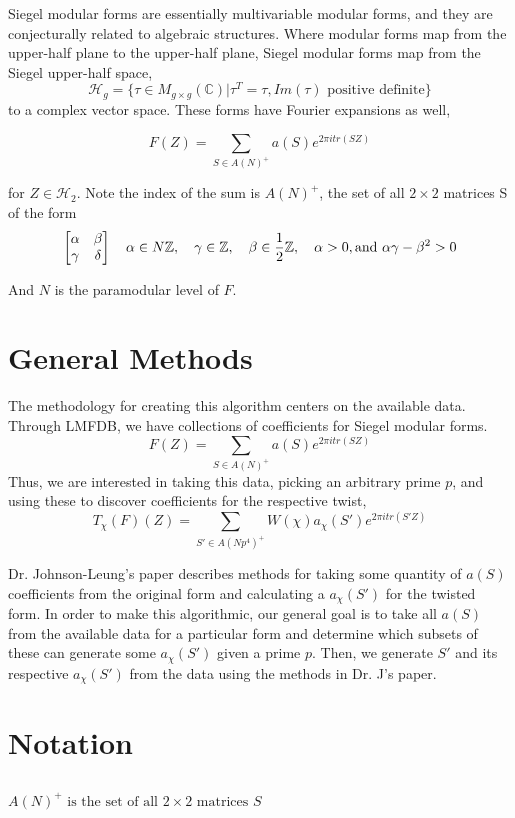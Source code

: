 \documentclass[11pt, oneside]{amsart}
\begin{document}
Siegel modular forms are essentially multivariable modular forms, and they are conjecturally related to algebraic structures. Where modular forms map from the upper-half plane to the upper-half plane, Siegel modular forms map from the Siegel upper-half space, $$\mathcal{H}_g = \{\tau \in M_{g\times g}(\mathbb{C}) \vert \tau^T = \tau, Im(\tau) \text{ positive definite}\}$$to a complex vector space. These forms have Fourier expansions as well,

$$F(Z) = \sum_{S\in A(N)^+}a(S)e^{2\pi itr(SZ)}$$

for $Z\in \mathcal{H}_2$. Note the index of the sum is $A(N)^+$, the set of all $2\times 2$ matrices S of the form
\[
\begin{bmatrix}
\alpha &	\beta \\
\gamma & \delta
\end{bmatrix}
\quad \alpha \in N\mathbb{Z} ,\quad  \gamma \in \mathbb{Z} ,\quad \beta \in \frac{1}{2} \mathbb{Z} ,\quad \alpha > 0, \\
\text{and } \alpha \gamma - \beta ^2 > 0
\]

And $N$ is the paramodular level of $F$.

\section{General Methods}

The methodology for creating this algorithm centers on the available data. Through LMFDB, we have collections of coefficients for Siegel modular forms. $$F(Z) = \sum_{S\in A(N)^+}a(S)e^{2\pi itr(SZ)}$$ Thus, we are interested in taking this data, picking an arbitrary prime $p$, and using these to discover coefficients for the respective twist, $$T_\chi (F)(Z) = \sum_{S'\in A(Np^4)^+}W(\chi)a_\chi (S')e^{2\pi itr(S'Z)}$$

Dr. Johnson-Leung's paper describes methods for taking some quantity of $a(S)$ coefficients from the original form and calculating a $a_\chi (S')$ for the twisted form. In order to make this algorithmic, our general goal is to take all $a(S)$ from the available data for a particular form and determine which subsets of these can generate some $a_\chi (S')$ given a prime $p$. Then, we generate $S'$ and its respective $a_\chi (S')$ from the data using the methods in Dr. J's paper.
\section{Notation}
\subsection{}
$A ( N ) ^ { + } \text { is the set of all } 2 \times 2 \text { matrices } S$\\
\end{document}
